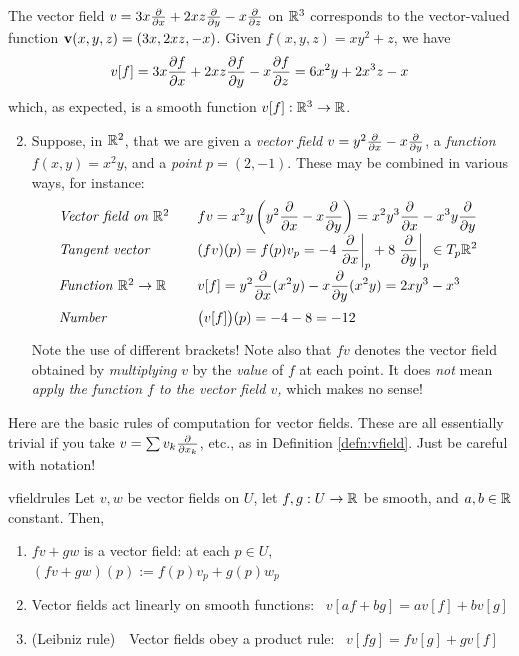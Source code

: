 \begin{examples}{}{}
	\exstart The vector field $v=3x\partials{x}+2xz\partials{y}-x\partials{z}$ on $\R^3$ corresponds to the vector-valued function $\vv(x,y,z)=(3x,2xz,-x)$. Given $f(x,y,z)=xy^2+z$, we have
	\[
		v[f]=3x\partials[f]{x}+2xz\partials[f]{y}-x\partials[f]{z}=6x^2y+2x^3z-x
	\]
	which, as expected, is a smooth function $v[f]:\R^3\to\R$.
	
	\begin{enumerate}\setcounter{enumi}{1}
		\item Suppose, in $\R^2$, that we are given a \emph{vector field} $v=y^2\partials{x}-x\partials{y}$, a \emph{function} $f(x,y)=x^2y$, and a \emph{point} $p=(2,-1)$. These may be combined in various ways, for instance:
		\[
			\def\arraystretch{1.7}
			\begin{array}{@{}l@{\qquad}l}
				\text{\emph{Vector field on $\R^2$}} & \displaystyle fv=x^2y\left(y^2\partials{x}-x\partials{y}\right) =x^2y^3\partials{x}-x^3y\partials{y} \\
	 			\text{\emph{Tangent vector}} & \displaystyle (fv)(p)=f(p) v_p=-4\partialsat{x}p+8\partialsat{y}p \in T_p\R^2 \\
				\text{\emph{Function} $\R^2\to\R$} & \displaystyle v[f]=y^2\partials{x}(x^2y)-x\partials{y}(x^2y)=2xy^3-x^3 \\
	 			\text{\emph{Number}} & \displaystyle \bigl(v[f]\bigr)(p) =-4-8=-12
			\end{array}
		\]
		Note the use of different brackets! Note also that $fv$ denotes the vector field obtained by \emph{multiplying} $v$ by the \emph{value} of $f$ at each point. It does \emph{not} mean \emph{apply the function $f$ to the vector field $v$,} which makes no sense!
	\end{enumerate}
\end{examples}

\goodbreak

Here are the basic rules of computation for vector fields. These are all essentially trivial if you take $v=\sum v_k\partials{x_k}$, etc., as in Definition \ref{defn:vfield}. Just be careful with notation!

\begin{lemm}{}{vfieldrules}
	Let $v,w$ be vector fields on $U$, let $f,g:U\to\R$ be smooth, and $a,b\in\R$ constant. Then,
	\begin{enumerate}
	  \item $fv+gw$ is a vector field: at each $p\in U$, $(fv+gw)(p):=f(p)v_p+g(p)w_p$
		\item Vector fields act linearly on smooth functions: \ $v[af+bg]=av[f]+bv[g]$
		\item (Leibniz rule)\ \ Vector fields obey a product rule: \ $v[fg]=fv[g]+gv[f]$
	\end{enumerate} 
\end{lemm}


